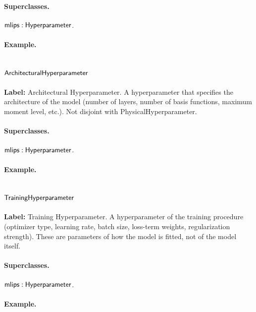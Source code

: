 \paragraph{Superclasses.} $\mathsf{mlips:Hyperparameter}$.

\paragraph{Example.}

\subsection{$\mathsf{ArchitecturalHyperparameter}$}
\label{sec:term-ArchitecturalHyperparameter}

\textbf{Label:} Architectural Hyperparameter.
A hyperparameter that specifies the architecture of the model (number of layers, number of basis functions, maximum moment level, etc.). Not disjoint with PhysicalHyperparameter.

\paragraph{Superclasses.} $\mathsf{mlips:Hyperparameter}$.

\paragraph{Example.}

\subsection{$\mathsf{TrainingHyperparameter}$}
\label{sec:term-TrainingHyperparameter}

\textbf{Label:} Training Hyperparameter.
A hyperparameter of the training procedure (optimizer type, learning rate, batch size, loss-term weights, regularization strength). These are parameters of how the model is fitted, not of the model itself.

\paragraph{Superclasses.} $\mathsf{mlips:Hyperparameter}$.

\paragraph{Example.}

